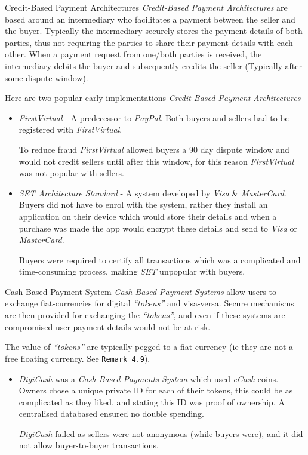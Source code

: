 \documentclass[11pt,a4paper]{article}
\begin{document}
  \begin{definition}{Credit-Based Payment Architectures}
    \textit{Credit-Based Payment Architectures} are based around an intermediary who facilitates a payment between the seller and the buyer. Typically the intermediary securely stores the payment details of both parties, thus not requiring the parties to share their payment details with each other. When a payment request from one/both parties is received, the intermediary debits the buyer and subsequently credits the seller (Typically after some dispute window).
    \par Here are two popular early implementations \textit{Credit-Based Payment Architectures}
    \begin{itemize}
      \item \textit{FirstVirtual} - A predecessor to \textit{PayPal}. Both buyers and sellers had to be registered with \textit{FirstVirtual}.
      \par To reduce fraud \textit{FirstVirtual} allowed buyers a 90 day dispute window and would not credit sellers until after this window, for this reason \textit{FirstVirtual} was not popular with sellers.

      \item \textit{SET Architecture Standard} - A system developed by \textit{Visa} \& \textit{MasterCard}. Buyers did not have to enrol with the system, rather they install an application on their device which would store their details and when a purchase was made the app would encrypt these details and send to \textit{Visa} or \textit{MasterCard}.
      \par Buyers were required to certify all transactions which was a complicated and time-consuming process, making \textit{SET} unpopular with buyers.
    \end{itemize}
  \end{definition}

  \begin{definition}{Cash-Based Payment System}
    \textit{Cash-Based Payment Systems} allow users to exchange fiat-currencies for digital \textit{``tokens''} and visa-versa. Secure mechanisms are then provided for exchanging the \textit{``tokens''}, and even if these systems are compromised user payment details would not be at risk.
    \par The value of \textit{``tokens''} are typically pegged to a fiat-currency (ie they are not a free floating currency. See \texttt{Remark 4.9}).
    \begin{itemize}
      \item \textit{DigiCash} was a \textit{Cash-Based Payments System} which used \textit{eCash} coins. Owners chose a unique private ID for each of their tokens, this could be as complicated as they liked, and stating this ID was proof of ownership. A centralised databased ensured no double spending.
      \par \textit{DigiCash} failed as sellers were not anonymous (while buyers were), and it did not allow buyer-to-buyer transactions.
    \end{itemize}
  \end{definition}
\end{document}
